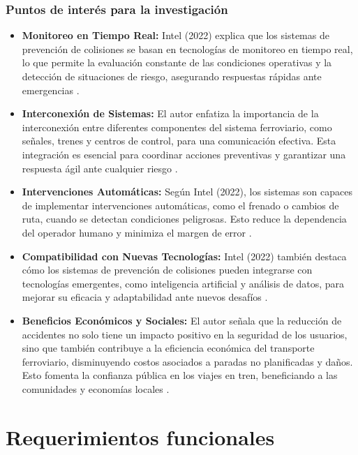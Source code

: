 \documentclass[journal]{IEEEtran}
\begin{document}
\subsubsection*{Puntos de interés para la investigación}  
\begin{itemize}
    \item \textbf{Monitoreo en Tiempo Real:}  
    Intel (2022) explica que los sistemas de prevención de colisiones se basan en tecnologías de monitoreo en tiempo real, lo que permite la evaluación constante de las condiciones operativas y la detección de situaciones de riesgo, asegurando respuestas rápidas ante emergencias \cite{intel2022collision}.   
    \item \textbf{Interconexión de Sistemas:}  
    El autor enfatiza la importancia de la interconexión entre diferentes componentes del sistema ferroviario, como señales, trenes y centros de control, para una comunicación efectiva. Esta integración es esencial para coordinar acciones preventivas y garantizar una respuesta ágil ante cualquier riesgo \cite{intel2022collision}.    
    \item \textbf{Intervenciones Automáticas:}  
    Según Intel (2022), los sistemas son capaces de implementar intervenciones automáticas, como el frenado o cambios de ruta, cuando se detectan condiciones peligrosas. Esto reduce la dependencia del operador humano y minimiza el margen de error \cite{intel2022collision}.  
    \item \textbf{Compatibilidad con Nuevas Tecnologías:}  
    Intel (2022) también destaca cómo los sistemas de prevención de colisiones pueden integrarse con tecnologías emergentes, como inteligencia artificial y análisis de datos, para mejorar su eficacia y adaptabilidad ante nuevos desafíos \cite{intel2022collision}.
    \item \textbf{Beneficios Económicos y Sociales:}  
    El autor señala que la reducción de accidentes no solo tiene un impacto positivo en la seguridad de los usuarios, sino que también contribuye a la eficiencia económica del transporte ferroviario, disminuyendo costos asociados a paradas no planificadas y daños. Esto fomenta la confianza pública en los viajes en tren, beneficiando a las comunidades y economías locales \cite{intel2022collision}.
\end{itemize}

\section{Requerimientos funcionales}
\end{document}
